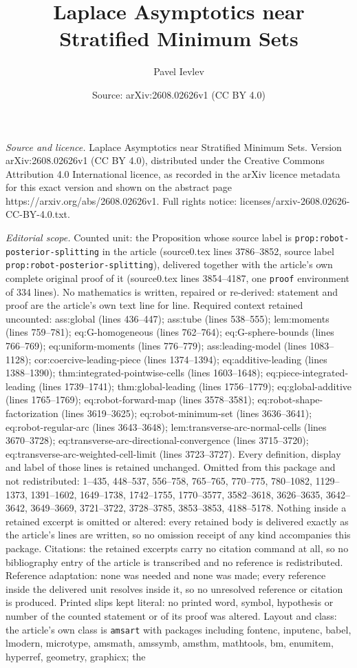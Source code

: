 \documentclass[10pt,a4paper]{amsart}
\title[Laplace Asymptotics near Stratified Minimum Sets]{Laplace Asymptotics near Stratified Minimum Sets}
\author{Pavel Ievlev}
\date{Source: arXiv:2608.02626v1 (CC BY 4.0)}
\begin{document}
\maketitle

\noindent\emph{Source and licence.} Laplace Asymptotics near Stratified Minimum Sets. Version arXiv:2608.02626v1 (CC BY 4.0), distributed under the Creative Commons Attribution 4.0 International licence, as recorded in the arXiv licence metadata for this exact version and shown on the abstract page https://arxiv.org/abs/2608.02626v1. Full rights notice: licenses/arxiv-2608.02626-CC-BY-4.0.txt.\par\smallskip

\noindent\textit{Editorial scope.} Counted unit: the Proposition whose source label is \texttt{prop:robot-posterior-splitting} in the article (source0.tex lines 3786--3852, source label \texttt{prop:robot-posterior-splitting}), delivered together with the article's own complete original proof of it (source0.tex lines 3854--4187, one \texttt{proof} environment of 334 lines). No mathematics is written, repaired or re-derived: statement and proof are the article's own text line for line. Required context retained uncounted: ass:global (lines 436--447); ass:tube (lines 538--555); lem:moments (lines 759--781); eq:G-homogeneous (lines 762--764); eq:G-sphere-bounds (lines 766--769); eq:uniform-moments (lines 776--779); ass:leading-model (lines 1083--1128); cor:coercive-leading-piece (lines 1374--1394); eq:additive-leading (lines 1388--1390); thm:integrated-pointwise-cells (lines 1603--1648); eq:piece-integrated-leading (lines 1739--1741); thm:global-leading (lines 1756--1779); eq:global-additive (lines 1765--1769); eq:robot-forward-map (lines 3578--3581); eq:robot-shape-factorization (lines 3619--3625); eq:robot-minimum-set (lines 3636--3641); eq:robot-regular-arc (lines 3643--3648); lem:transverse-arc-normal-cells (lines 3670--3728); eq:transverse-arc-directional-convergence (lines 3715--3720); eq:transverse-arc-weighted-cell-limit (lines 3723--3727). Every definition, display and label of those lines is retained unchanged. Omitted from this package and not redistributed: 1--435, 448--537, 556--758, 765--765, 770--775, 780--1082, 1129--1373, 1391--1602, 1649--1738, 1742--1755, 1770--3577, 3582--3618, 3626--3635, 3642--3642, 3649--3669, 3721--3722, 3728--3785, 3853--3853, 4188--5178. Nothing inside a retained excerpt is omitted or altered: every retained body is delivered exactly as the article's lines are written, so no omission receipt of any kind accompanies this package. Citations: the retained excerpts carry no citation command at all, so no bibliography entry of the article is transcribed and no reference is redistributed. Reference adaptation: none was needed and none was made; every reference inside the delivered unit resolves inside it, so no unresolved reference or citation is produced. Printed slips kept literal: no printed word, symbol, hypothesis or number of the counted statement or of its proof was altered. Layout and class: the article's own class is \texttt{amsart} with packages including fontenc, inputenc, babel, lmodern, microtype, amsmath, amssymb, amsthm, mathtools, bm, enumitem, hyperref, geometry, graphicx; the 
\end{document}
